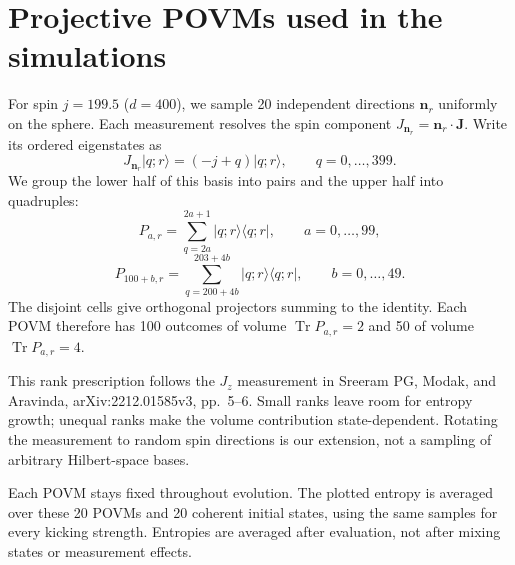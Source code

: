 \documentclass[11pt,a4paper]{article}
\newcommand{\Tr}{\operatorname{Tr}}
\begin{document}
\section*{Projective POVMs used in the simulations}
For spin $j=199.5$ ($d=400$), we sample 20 independent directions $\mathbf n_r$ uniformly on the sphere. Each measurement resolves the spin component $J_{\mathbf n_r}=\mathbf n_r\cdot\mathbf J$. Write its ordered eigenstates as
\[J_{\mathbf n_r}|q;r\rangle=(-j+q)|q;r\rangle,\qquad q=0,\ldots,399.\]
We group the lower half of this basis into pairs and the upper half into quadruples:
\[P_{a,r}=\sum_{q=2a}^{2a+1}|q;r\rangle\langle q;r|,\qquad a=0,\ldots,99,\]
\[P_{100+b,r}=\sum_{q=200+4b}^{203+4b}|q;r\rangle\langle q;r|,\qquad b=0,\ldots,49.\]
The disjoint cells give orthogonal projectors summing to the identity. Each POVM therefore has 100 outcomes of volume $\Tr P_{a,r}=2$ and 50 of volume $\Tr P_{a,r}=4$.

This rank prescription follows the $J_z$ measurement in Sreeram PG, Modak, and Aravinda, arXiv:2212.01585v3, pp.~5--6. Small ranks leave room for entropy growth; unequal ranks make the volume contribution state-dependent. Rotating the measurement to random spin directions is our extension, not a sampling of arbitrary Hilbert-space bases.

Each POVM stays fixed throughout evolution. The plotted entropy is averaged over these 20 POVMs and 20 coherent initial states, using the same samples for every kicking strength. Entropies are averaged after evaluation, not after mixing states or measurement effects.
\end{document}
